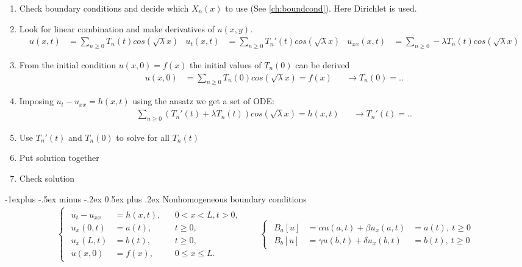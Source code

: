 \documentclass[10pt,landscape]{scrartcl}
\makeatletter
\renewcommand{\subsection}{\@startsection{subsection}{2}{0mm}%
                                {-1explus -.5ex minus -.2ex}%
                                {0.5ex plus .2ex}%
                                {\normalfont\normalsize\bfseries}}
\makeatother
\begin{document}
\begin{multicols*}{2}
  \begin{enumerate}
    \item Check boundary conditions and decide which $X_n(x)$ to use (See \ref{ch:boundcond}). Here Dirichlet is used.
    \item Look for linear combination and make derivatives of $u(x,y)$.
      \begin{align*}
        u(x,t) &= \sum_{n\geq0} T_n(t)cos(\sqrt{\lambda}x) & u_t(x,t) &= \sum_{n\geq0} T_n'(t)cos(\sqrt{\lambda}x) & u_{xx}(x,t) &= \sum_{n\geq0} -\lambda T_n(t)cos(\sqrt{\lambda}x)
      \end{align*}
    \item From the initial condition $u(x,0)=f(x)$ the initial values of $T_n(0)$ can be derived
      \begin{align*}
        u(x,0) &= \sum_{n\geq0} T_n(0)cos(\sqrt{\lambda}x) = f(x) & &\longrightarrow T_n(0)=..
      \end{align*}
    \item Imposing $u_t-u_{xx} = h(x,t)$ using the ansatz we get a set of ODE:
      \begin{align*}
        \sum_{n\geq0} (T_n'(t)+\lambda T_n(t) ) cos(\sqrt{\lambda}x) = h(x,t) & &\longrightarrow T_n'(t)=..
      \end{align*}
    \item Use $T_n'(t)$ and $T_n(0)$ to solve for all $T_n(t)$
    \item Put solution together
    \item Check solution
  \end{enumerate}

\subsection{Nonhomogeneous boundary conditions}
  \begin{align*}
    \begin{cases}
      \begin{aligned}
        u_t - u_{xx} &= h(x,t), & &0<x<L, t>0,\\
        u_x(0,t) &= a(t),     & &t\geq0,\\
        u_x(L,t) &= b(t),     & &t\geq0,\\
        u(x,0)  &= f(x),          & &0\leq x\leq L.
      \end{aligned}
    \end{cases}
    &&
    \begin{cases}
      \begin{aligned}
        B_a[u]&=\alpha u(a,t)+\beta  u_x(a,t)&=a(t),\ t\geq0 \\ 
        B_b[u]&=\gamma u(b,t)+\delta u_x(b,t)&=b(t),\ t\geq0
      \end{aligned}
    \end{cases}
  \end{align*}


\end{multicols*}
\end{document}
